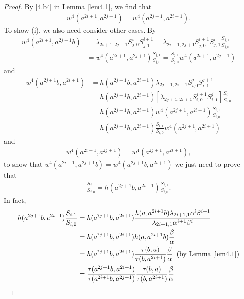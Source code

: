 \documentclass[a4paper,11pt]{amsart}
\numberwithin{equation}{section}
\begin{document}
\begin{proof}
By \eqref{4.b4} in Lemma \ref{lem4.1}, we find that
\begin{align}
\label{wt1} w^4(a^{2i+1},a^{2j+1})=w^4(a^{2j+1},a^{2i+1}).
\end{align}
To show (i), we also need consider other cases. By
\begin{align*}
w^4(a^{2i+1},a^{2j+1}b)&=\lambda_{2i+1,2j+1} S_{j,0}^i S_{j,1}^{i+1}=\lambda_{2i+1,2j+1} S_{j,0}^{i+1} S_{j,1}^{i} \frac{S_{j,1}}{S_{j,0}}\\
&=w^4(a^{2i+1},a^{2j+1}) \frac{S_{j,1}}{S_{j,0}}=\frac{S_{j,1}}{S_{j,0}} w^4(a^{2i+1},a^{2j+1})
\end{align*}
and
\begin{align*}
w^4(a^{2j+1}b,a^{2i+1})&=h(a^{2j+1}b,a^{2i+1})\lambda_{2j+1,2i+1} S_{i,0}^j S_{i,1}^{j+1}\\
&=h(a^{2j+1}b,a^{2i+1})[\lambda_{2j+1,2i+1} S_{i,0}^{j+1} S_{i,1}^{j}] \frac{S_{i,1}}{S_{i,0}}\\
&=h(a^{2j+1}b,a^{2i+1}) w^4(a^{2j+1},a^{2i+1}) \frac{S_{i,1}}{S_{i,0}}\\
&=h(a^{2j+1}b,a^{2i+1}) \frac{S_{i,1}}{S_{i,0}} w^4(a^{2j+1},a^{2i+1})
\end{align*}
and
\begin{align*}
w^4(a^{2i+1},a^{2j+1})=w^4(a^{2j+1},a^{2i+1}),
\end{align*}
 to show that $w^4(a^{2i+1},a^{2j+1}b)=w^4(a^{2j+1}b,a^{2i+1})$ we just need to prove that
\begin{align*}
 \frac{S_{j,1}}{S_{j,0}}=h(a^{2j+1}b,a^{2i+1}) \frac{S_{i,1}}{S_{i,0}}.
\end{align*}
In fact,
\begin{align*}
h(a^{2j+1}b,a^{2i+1}) \frac{S_{i,1}}{S_{i,0}}&=h(a^{2j+1}b,a^{2i+1}) \frac{h(a,a^{2i+1}b) \lambda_{2i+1,1} \alpha^i \beta^{i+1}}{\lambda_{2i+1,1} \alpha^{i+1} \beta^{i}}\\
&=h(a^{2j+1}b,a^{2i+1}) h(a,a^{2i+1}b) \frac{\beta}{\alpha}\\
&=h(a^{2j+1}b,a^{2i+1}) \frac{\tau(b,a)}{\tau(b,a^{2i+1})} \frac{\beta}{\alpha}\;\;(\text{by Lemma}\;\ref{lem4.1})\\
&=\frac{\tau(a^{2j+1}b,a^{2i+1})}{\tau(a^{2i+1}b,a^{2j+1})} \frac{\tau(b,a)}{\tau(b,a^{2i+1})} \frac{\beta}{\alpha}\\

\end{align*}
\end{proof}
\end{document}
